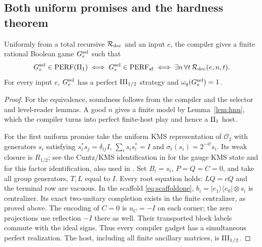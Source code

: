 \subsection{Both uniform promises and the hardness theorem}\label{sec:promises}
\begin{theorem}\label{thm:selreduction}
Uniformly from a total recursive $\mathcal R_{\rm dec}$ and an input $e$, the compiler gives a finite rational Boolean game $G^{\rm sel}_e$ such that
\[
 G^{\rm sel}_e\in\mathrm{PERF}(\mathrm{II}_1)
 \iff G^{\rm sel}_e\in\mathrm{PERF}_{\mathrm{sf}}
 \iff \exists n\,\forall t\,\mathcal R_{\rm dec}(e,n,t).
\]
For every input $e$, $G^{\rm sel}_e$ has a perfect $\mathrm{III}_{1/2}$ strategy and $\omega_q(G^{\rm sel}_e)=1$.
\end{theorem}
\begin{proof}
For the equivalence, soundness follows from the compiler and the selector and level-reader lemmas. A good $n$ gives a finite model by Lemma~\ref{lem:hnn}, which the compiler turns into perfect finite-host play and hence a $\mathrm{II}_1$ host.

For the first uniform promise take the uniform KMS representation of $\mathcal O_2$ with generators $s_i$ satisfying $s_i^*s_j=\delta_{ij}I$, $\sum_i s_is_i^*=I$ and $\sigma_t(s_i)=2^{-it}s_i$. Its weak closure is $R_{1/2}$; see the Cuntz/KMS identification in \cite{OP} for the gauge KMS state and \cite[Theorem 4.9 and Example 4.13]{HarrisEmbezzlement} for this factor identification, also used in \cite[Section 3.1]{ReadType}. Set $B_i=s_i$, $P=Q=C=0$, and take all group generators, $T,L$ equal to $I$. Every root equation holds: $LQ=cQ$ and the terminal row are vacuous. In the scaffold \eqref{eq:scaffoldone}, $b_i=|e_1\rangle\langle e_0|\otimes s_i$ is centralizer. Its exact two-unitary completion exists in the finite centralizer, as proved above. The encoding of $C=0$ is $u_C=-I$ on each corner; the zero projections use reflection $-I$ there as well. Their transported block labels commute with the ideal signs. Thus every compiler gadget has a simultaneous perfect realization. The host, including all finite ancillary matrices, is $\mathrm{III}_{1/2}$.


\end{proof}
